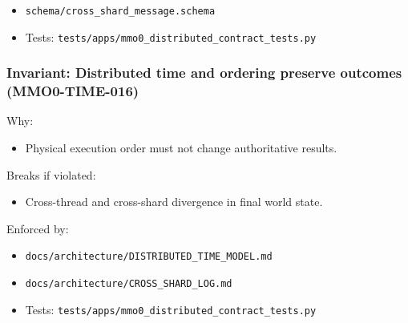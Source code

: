 \documentclass[9pt,a4paper,openany]{book}
\begin{document}
\begin{itemize}
\item \texttt{schema/\allowbreak{}cross\_\allowbreak{}shard\_\allowbreak{}message.\allowbreak{}schema}
\end{itemize}


\begin{itemize}
\item Tests: \texttt{tests/\allowbreak{}apps/\allowbreak{}mmo0\_\allowbreak{}distributed\_\allowbreak{}contract\_\allowbreak{}tests.\allowbreak{}py}
\end{itemize}





\subsubsection{Invariant: Distributed time and ordering preserve outcomes (MMO0-TIME-016)}


Why:



\begin{itemize}
\item Physical execution order must not change authoritative results.\allowbreak{}
\end{itemize}


Breaks if violated:



\begin{itemize}
\item Cross-\allowbreak{}thread and cross-\allowbreak{}shard divergence in final world state.\allowbreak{}
\end{itemize}


Enforced by:



\begin{itemize}
\item \texttt{docs/\allowbreak{}architecture/\allowbreak{}DISTRIBUTED\_\allowbreak{}TIME\_\allowbreak{}MODEL.\allowbreak{}md}
\end{itemize}


\begin{itemize}
\item \texttt{docs/\allowbreak{}architecture/\allowbreak{}CROSS\_\allowbreak{}SHARD\_\allowbreak{}LOG.\allowbreak{}md}
\end{itemize}


\begin{itemize}
\item Tests: \texttt{tests/\allowbreak{}apps/\allowbreak{}mmo0\_\allowbreak{}distributed\_\allowbreak{}contract\_\allowbreak{}tests.\allowbreak{}py}
\end{itemize}
\end{document}
